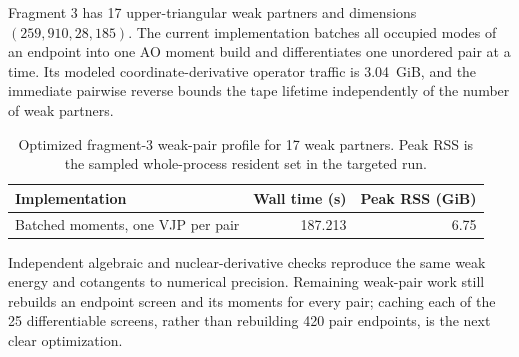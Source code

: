 \documentclass[11pt]{article}
\begin{document}
Fragment 3 has 17 upper-triangular weak partners and dimensions
$(259,910,28,185)$.  The current implementation batches all occupied modes of
an endpoint into one AO moment build and differentiates one unordered pair at
a time.  Its modeled coordinate-derivative operator traffic is 3.04~GiB, and
the immediate pairwise reverse bounds the tape lifetime independently of the
number of weak partners.

\begin{table}[htbp]
 \centering
 \caption{Optimized fragment-3 weak-pair profile for 17 weak partners.  Peak
 RSS is the sampled whole-process resident set in the targeted run.}
 \label{tab:c25-weak-profile}
 \scriptsize
 \begin{tabular}{@{}lrr@{}}
  \toprule
  Implementation & Wall time (s) & Peak RSS (GiB) \\
  \midrule
  Batched moments, one VJP per pair & 187.213 & 6.75 \\
  \bottomrule
 \end{tabular}
\end{table}

Independent algebraic and nuclear-derivative checks reproduce the same weak
energy and cotangents to numerical precision.  Remaining weak-pair work still
rebuilds an endpoint screen and its moments for every pair; caching each of
the 25 differentiable screens, rather than rebuilding 420 pair endpoints, is
the next clear optimization.
\end{document}
